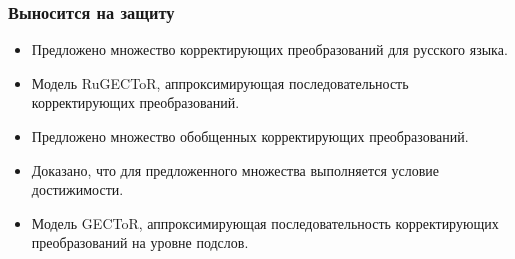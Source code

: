 \documentclass[10pt]{beamer}
\begin{document}
\begin{frame}
\frametitle{Выносится на защиту}

\begin{itemize}
\item Предложено множество корректирующих преобразований для русского языка.
\item Модель RuGECToR, аппроксимирующая последовательность корректирующих преобразований.
\item Предложено множество обобщенных корректирующих преобразований.
\item Доказано, что для предложенного множества выполняется условие достижимости.
\item Модель GECToR, аппроксимирующая последовательность корректирующих преобразований на уровне подслов.
\end{itemize}


\end{frame}
\end{document}
